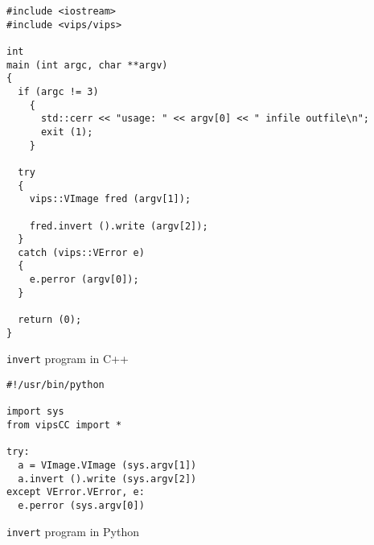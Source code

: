 \begin{fig2}
\begin{verbatim}
#include <iostream>
#include <vips/vips>

int
main (int argc, char **argv)
{
  if (argc != 3)
    {
      std::cerr << "usage: " << argv[0] << " infile outfile\n";
      exit (1);
    }

  try
  {
    vips::VImage fred (argv[1]);

    fred.invert ().write (argv[2]);
  }
  catch (vips::VError e)
  {
    e.perror (argv[0]);
  }

  return (0);
}
\end{verbatim}
\caption{\texttt{invert} program in C++}
\label{fg:invert-c++}
\end{fig2}

\begin{fig2}
\begin{verbatim}
#!/usr/bin/python

import sys
from vipsCC import *

try:
  a = VImage.VImage (sys.argv[1])
  a.invert ().write (sys.argv[2])
except VError.VError, e:
  e.perror (sys.argv[0])
\end{verbatim}
\caption{\texttt{invert} program in Python}
\label{fg:invert-py}
\end{fig2}
